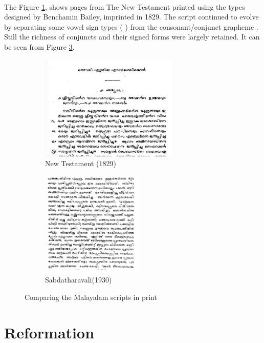 \documentclass[10pt]{article}
\begin{document}
\paragraph{}
The Figure \ref{newtestament}, shows pages from The New Testament printed using the types designed by Benchamin Bailey, imprinted in 1829. The script continued to evolve by separating some vowel sign types (\begingroup {} \endgroup) from the consonant/conjunct grapheme . Still the richness of conjuncts and their signed forms were largely retained. It can be seen from Figure \ref{Sabdatharavali}. 


\begin{figure}
\begin{subfigure}{.5\textwidth}
  \centering
  \includegraphics[width=\linewidth, height=5cm]{images/newtestament1829.png}
  \caption{New Testament (1829)}
  \label{newtestament}
\end{subfigure}%
\begin{subfigure}{.5\textwidth}
  \centering
  \includegraphics[width=\linewidth,height=5cm]{images/1930-Sabdatharavali.png}
  \caption{Sabdatharavali(1930)}
  \label{Sabdatharavali}
\end{subfigure}
\caption{Comparing the Malayalam scripts in print}
\end{figure}


\section{Reformation}
\end{document}
